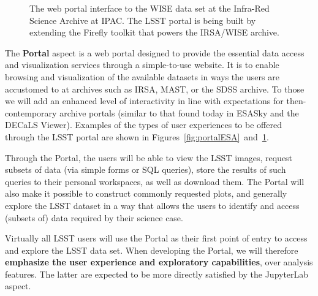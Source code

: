 \documentclass[DM,lsstdraft,toc]{lsstdoc}
\begin{document}
\begin{figure}
	\centering
	\caption{The web portal interface to the WISE data set at the Infra-Red Science Archive at IPAC. The LSST portal is being built by extending the Firefly toolkit that powers the IRSA/WISE archive.
		\label{fig:portalIRSA}}
\end{figure}

The \textbf{Portal} aspect is a web portal designed to provide the essential data
access and visualization services through a simple-to-use website.  It is to
enable browsing and visualization of the available datasets in ways the
users are accustomed to at archives such as IRSA, MAST, or the SDSS archive.
To those we will add an enhanced level of interactivity in line with expectations for
then-contemporary archive portals (similar to that found today in ESASky and
the DECaLS Viewer). Examples of the types of user experiences to be offered
through the LSST portal are shown in Figures~\ref{fig:portalESA}~and~\ref{fig:portalIRSA}.

Through the Portal, the users will be
able to view the LSST images, request subsets of data (via simple forms or
SQL queries), store the results of such queries to their personal
workspaces, as well as download them. The Portal will also make it possible to
construct commonly requested plots, and generally explore the
LSST dataset in a way that allows the users to identify and access (subsets of)
data required by their science case.

Virtually all LSST users will use the Portal as their first point of entry to
access and explore the LSST data set. When developing the Portal,
we will therefore \textbf{emphasize the user experience and exploratory
capabilities}, over analysis features. The latter are expected to be more
directly satisfied by the JupyterLab aspect.
\end{document}
